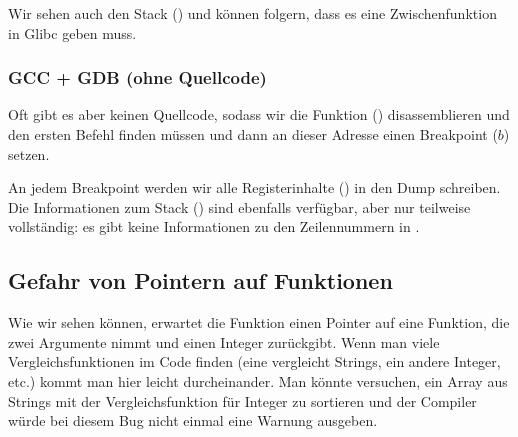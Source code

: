Wir sehen auch den Stack () und können folgern, dass es eine Zwischenfunktion  in Glibc
geben muss.



\subsubsection{GCC + GDB (ohne Quellcode)}
Oft gibt es aber keinen Quellcode, sodass wir die \comp Funktion () disassemblieren und den ersten \CMP Befehl
finden müssen und dann an dieser Adresse einen Breakpoint ($b$) setzen.

An jedem Breakpoint werden wir alle Registerinhalte () in den Dump schreiben.
Die Informationen zum Stack () sind ebenfalls verfügbar, aber nur teilweise vollständig: es gibt keine
Informationen zu den Zeilennummern in \comp.



\subsection{Gefahr von Pointern auf Funktionen}
Wie wir sehen können, erwartet die Funktion \qsort einen Pointer auf eine Funktion, die zwei  Argumente nimmt
und einen Integer zurückgibt.
Wenn man viele Vergleichsfunktionen im Code finden (eine vergleicht Strings, ein andere Integer, etc.) kommt man hier
leicht durcheinander.
Man könnte versuchen, ein Array aus Strings mit der Vergleichsfunktion für Integer zu sortieren und der Compiler würde
bei diesem Bug nicht einmal eine Warnung ausgeben.
